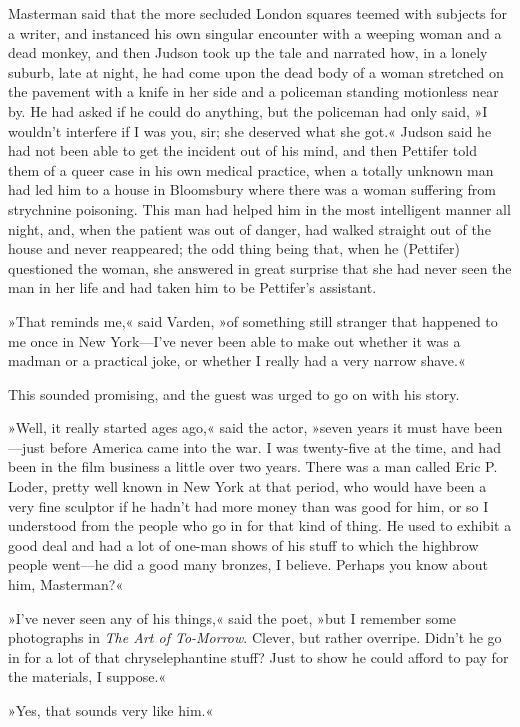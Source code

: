 Masterman said that the more secluded London squares teemed with subjects for a writer, and instanced his own singular encounter with a weeping woman and a dead monkey, and then Judson took up the tale and narrated how, in a lonely suburb, late at night, he had come upon the dead body of a woman stretched on the pavement with a knife in her side and a policeman standing motionless near by. He had asked if he could do anything, but the policeman had only said, »I wouldn't interfere if I was you, sir; she deserved what she got.« Judson said he had not been able to get the incident out of his mind, and then Pettifer told them of a queer case in his own medical practice, when a totally unknown man had led him to a house in Bloomsbury where there was a woman suffering from strychnine poisoning. This man had helped him in the most intelligent manner all night, and, when the patient was out of danger, had walked straight out of the house and never reappeared; the odd thing being that, when he (Pettifer) questioned the woman, she answered in great surprise that she had never seen the man in her life and had taken him to be Pettifer's assistant.

»That reminds me,« said Varden, »of something still stranger that happened to me once in New York—I've never been able to make out whether it was a madman or a practical joke, or whether I really had a very narrow shave.«

This sounded promising, and the guest was urged to go on with his story.

»Well, it really started ages ago,« said the actor, »seven years it must have been—just before America came into the war. I was twenty-five at the time, and had been in the film business a little over two years. There was a man called Eric P\@. Loder, pretty well known in New York at that period, who would have been a very fine sculptor if he hadn't had more money than was good for him, or so I understood from the people who go in for that kind of thing. He used to exhibit a good deal and had a lot of one-man shows of his stuff to which the highbrow people went—he did a good many bronzes, I believe. Perhaps you know about him, Masterman?«

»I've never seen any of his things,« said the poet, »but I remember some photographs in \textit{The Art of To-Morrow}. Clever, but rather overripe. Didn't he go in for a lot of that chryselephantine stuff? Just to show he could afford to pay for the materials, I suppose.«

»Yes, that sounds very like him.«

